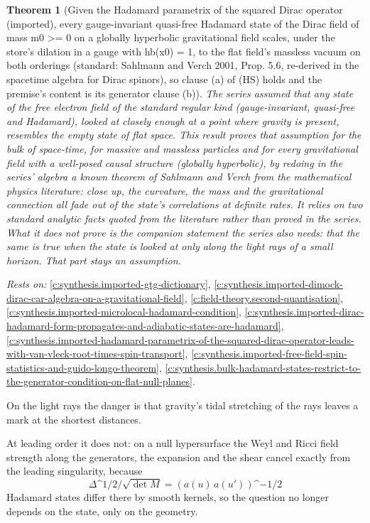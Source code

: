 \documentclass[11pt]{article}
\newtheorem{theorem}{Theorem}[section]
\theoremstyle{definition}
\theoremstyle{plain}
\begin{document}
\begin{theorem}[Given the Hadamard parametrix of the squared Dirac operator (imported), every gauge-invariant quasi-free Hadamard state of the Dirac field of mass m0 >= 0 on a globally hyperbolic gravitational field scales, under the store's dilation in a gauge with hb(x0) = 1, to the flat field's massless vacuum on both orderings (standard: Sahlmann and Verch 2001, Prop. 5.6, re-derived in the spacetime algebra for Dirac spinors), so clause (a) of (HS) holds and the premise's content is its generator clause (b)]\label{c:synthesis.hadamard-dirac-states-scale-to-the-flat-massless-vacuum-at-every-point-of-a-gravitational-field}
The series assumed that any state of the free electron field of the standard regular kind (gauge-invariant, quasi-free and Hadamard), looked at closely enough at a point where gravity is present, resembles the empty state of flat space. This result proves that assumption for the bulk of space-time, for massive and massless particles and for every gravitational field with a well-posed causal structure (globally hyperbolic), by redoing in the series' algebra a known theorem of Sahlmann and Verch from the mathematical physics literature: close up, the curvature, the mass and the gravitational connection all fade out of the state's correlations at definite rates. It relies on two standard analytic facts quoted from the literature rather than proved in the series. What it does not prove is the companion statement the series also needs: that the same is true when the state is looked at only along the light rays of a small horizon. That part stays an assumption.
\end{theorem}
\noindent\emph{Rests on:} \ref{c:synthesis.imported-gtg-dictionary}, \ref{c:synthesis.imported-dimock-dirac-car-algebra-on-a-gravitational-field}, \ref{c:field-theory.second-quantisation}, \ref{c:synthesis.imported-microlocal-hadamard-condition}, \ref{c:synthesis.imported-dirac-hadamard-form-propagates-and-adiabatic-states-are-hadamard}, \ref{c:synthesis.imported-hadamard-parametrix-of-the-squared-dirac-operator-leads-with-van-vleck-root-times-spin-transport}, \ref{c:synthesis.imported-free-field-spin-statistics-and-guido-longo-theorem}, \ref{c:synthesis.bulk-hadamard-states-restrict-to-the-generator-condition-on-flat-null-planes}.

On the light rays the danger is that gravity's tidal stretching of the rays leaves a mark at the shortest distances.

At leading order it does not: on a null hypersurface the Weyl and Ricci field strength along the generators, the expansion and the shear cancel exactly from the leading singularity, because \[ \Delta\^{}{1/2}/\sqrt{\det M} = (a(u)\,a(u'))\^{}{-1/2} \] Hadamard states differ there by smooth kernels, so the question no longer depends on the state, only on the geometry.
\end{document}
